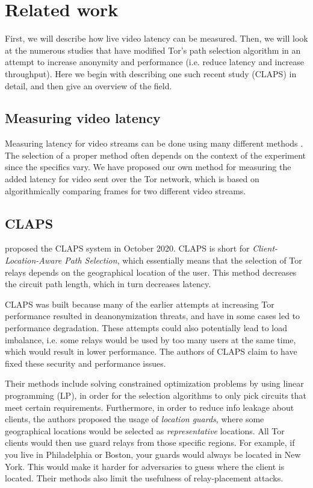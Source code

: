 \documentclass{kththesis}
\begin{document}
\section{Related work}
\label{section:relatedWork}
First, we will describe how live video latency can be measured. Then, we will look at the numerous studies that have modified Tor's path selection algorithm in an attempt to increase anonymity and performance (i.e. reduce latency and increase throughput). Here we begin with describing one such recent study (CLAPS) in detail, and then give an overview of the field.

\subsection{Measuring video latency}
Measuring latency for video streams can be done using many different methods \parencite{hill2009measuring}\parencite{sielhorst2007measurement}. The selection of a proper method often depends on the context of the experiment since the specifics vary. We have proposed our own method for measuring the added latency for video sent over the Tor network, which is based on algorithmically comparing frames for two different video streams.

\subsection{CLAPS}
\label{section:CLAPS}
\textcite{CLAPS} proposed the CLAPS system in October 2020. CLAPS is short for \emph{Client-Location-Aware Path Selection}, which essentially means that the selection of Tor relays depends on the geographical location of the user. This method decreases the circuit path length, which in turn decreases latency.

CLAPS was built because many of the earlier attempts at increasing Tor performance resulted in deanonymization threats, and have in some cases led to performance degradation. These attempts could also potentially lead to load imbalance, i.e. some relays would be used by too many users at the same time, which would result in lower performance. The authors of CLAPS claim to have fixed these security and performance issues.

Their methods include solving constrained optimization problems by using linear programming (LP), in order for the selection algorithms to only pick circuits that meet certain requirements. Furthermore, in order to reduce info leakage about clients, the authors proposed the usage of \emph{location guards}, where some geographical locations would be selected as \emph{representative} locations. All Tor clients would then use guard relays from those specific regions. For example, if you live in Philadelphia or Boston, your guards would always be located in New York. This would make it harder for adversaries to guess where the client is located. Their methods also limit the usefulness of relay-placement attacks. 
\end{document}

